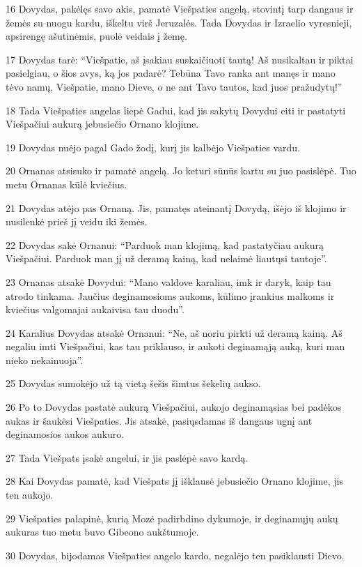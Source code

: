 \par 16 Dovydas, pakėlęs savo akis, pamatė Viešpaties angelą, stovintį tarp dangaus ir žemės su nuogu kardu, iškeltu virš Jeruzalės. Tada Dovydas ir Izraelio vyresnieji, apsirengę ašutinėmis, puolė veidais į žemę. 
\par 17 Dovydas tarė: “Viešpatie, aš įsakiau suskaičiuoti tautą! Aš nusikaltau ir piktai pasielgiau, o šios avys, ką jos padarė? Tebūna Tavo ranka ant manęs ir mano tėvo namų, Viešpatie, mano Dieve, o ne ant Tavo tautos, kad juos pražudytų!” 
\par 18 Tada Viešpaties angelas liepė Gadui, kad jis sakytų Dovydui eiti ir pastatyti Viešpačiui aukurą jebusiečio Ornano klojime. 
\par 19 Dovydas nuėjo pagal Gado žodį, kurį jis kalbėjo Viešpaties vardu. 
\par 20 Ornanas atsisuko ir pamatė angelą. Jo keturi sūnūs kartu su juo pasislėpė. Tuo metu Ornanas kūlė kviečius. 
\par 21 Dovydas atėjo pas Ornaną. Jis, pamatęs ateinantį Dovydą, išėjo iš klojimo ir nusilenkė prieš jį veidu iki žemės. 
\par 22 Dovydas sakė Ornanui: “Parduok man klojimą, kad pastatyčiau aukurą Viešpačiui. Parduok man jį už deramą kainą, kad nelaimė liautųsi tautoje”. 
\par 23 Ornanas atsakė Dovydui: “Mano valdove karaliau, imk ir daryk, kaip tau atrodo tinkama. Jaučius deginamosioms aukoms, kūlimo įrankius malkoms ir kviečius valgomajai aukai­visa tau duodu”. 
\par 24 Karalius Dovydas atsakė Ornanui: “Ne, aš noriu pirkti už deramą kainą. Aš negaliu imti Viešpačiui, kas tau priklauso, ir aukoti deginamąją auką, kuri man nieko nekainuoja”. 
\par 25 Dovydas sumokėjo už tą vietą šešis šimtus šekelių aukso. 
\par 26 Po to Dovydas pastatė aukurą Viešpačiui, aukojo deginamąsias bei padėkos aukas ir šaukėsi Viešpaties. Jis atsakė, pasiųsdamas iš dangaus ugnį ant deginamosios aukos aukuro. 
\par 27 Tada Viešpats įsakė angelui, ir jis paslėpė savo kardą. 
\par 28 Kai Dovydas pamatė, kad Viešpats jį išklausė jebusiečio Ornano klojime, jis ten aukojo. 
\par 29 Viešpaties palapinė, kurią Mozė padirbdino dykumoje, ir deginamųjų aukų aukuras tuo metu buvo Gibeono aukštumoje. 
\par 30 Dovydas, bijodamas Viešpaties angelo kardo, negalėjo ten pasiklausti Dievo.



